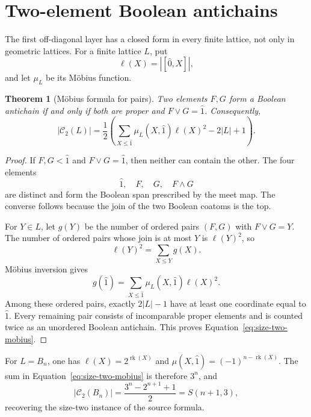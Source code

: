 \documentclass[11pt]{article}
\newtheorem{theorem}{Theorem}[section]
\theoremstyle{definition}
\theoremstyle{remark}
\newcommand{\rk}{\operatorname{rk}}
\newcommand{\cC}{\mathcal C}
\begin{document}
\section{Two-element Boolean antichains}

The first off-diagonal layer has a closed form in every finite lattice, not
only in geometric lattices.  For a finite lattice $L$, put
\[
 \ell(X)=|[\hat0,X]|,
\]
and let $\mu_L$ be its M\"obius function.

\begin{theorem}[M\"obius formula for pairs]\label{thm:size-two}
Two elements $F,G$ form a Boolean antichain if and only if both are proper
and $F\vee G=\hat1$.
Consequently,
\begin{equation}\label{eq:size-two-mobius}
 |\cC_2(L)|=\frac12\left(
  \sum_{X\le\hat1}\mu_L(X,\hat1)\ell(X)^2-2|L|+1
 \right).
\end{equation}
\end{theorem}

\begin{proof}
If $F,G<\hat1$ and $F\vee G=\hat1$, then neither can contain the other.  The
four elements
\[
 \hat1,\quad F,\quad G,\quad F\wedge G
\]
are distinct and form the Boolean span prescribed by the meet map.  The
converse follows because the join of the two Boolean coatoms is the top.

For $Y\in L$, let $g(Y)$ be the number of ordered pairs $(F,G)$ with
$F\vee G=Y$.  The number of ordered pairs whose join is at most $Y$ is
$\ell(Y)^2$, so
\[
 \ell(Y)^2=\sum_{X\le Y}g(X).
\]
M\"obius inversion gives
\[
 g(\hat1)=\sum_{X\le\hat1}\mu_L(X,\hat1)\ell(X)^2.
\]
Among these ordered pairs, exactly $2|L|-1$ have at least one coordinate
equal to $\hat1$.  Every remaining pair consists of incomparable proper
elements and is counted twice as an unordered Boolean antichain.  This proves
Equation~\eqref{eq:size-two-mobius}.
\end{proof}

For $L=B_n$, one has $\ell(X)=2^{\rk(X)}$ and
$\mu(X,\hat1)=(-1)^{n-\rk(X)}$.  The sum in
Equation~\eqref{eq:size-two-mobius} is therefore $3^n$, and
\[
 |\cC_2(B_n)|=\frac{3^n-2^{n+1}+1}{2}=S(n+1,3),
\]
recovering the size-two instance of the source formula.
\end{document}

